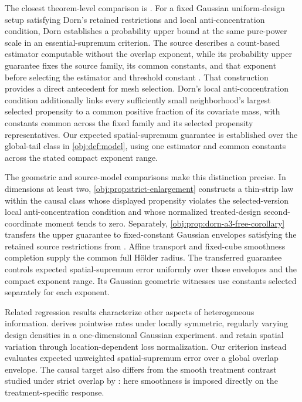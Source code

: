 The closest theorem-level comparison is \citet[Assumptions 1--3 and Theorem 1(ii), p.~12]{Dorn2026GlobalOverlap}. For a fixed Gaussian uniform-design setup satisfying Dorn's retained restrictions and local anti-concentration condition, Dorn establishes a probability upper bound at the same pure-power scale in an essential-supremum criterion. The source describes a count-based estimator computable without the overlap exponent, while its probability upper guarantee fixes the source family, its common constants, and that exponent before selecting the estimator and threshold constant \citep[Lemmas 11 and 13, pp.~23--24; proof, pp.~27--28]{Dorn2026GlobalOverlap}. That construction provides a direct antecedent for mesh selection. Dorn's local anti-concentration condition additionally links every sufficiently small neighborhood's largest selected propensity to a common positive fraction of its covariate mass, with constants common across the fixed family and its selected propensity representatives. Our expected spatial-supremum guarantee is established over the global-tail class in \cref{obj:def:model}, using one estimator and common constants across the stated compact exponent range.

The geometric and source-model comparisons make this distinction precise. In dimensions at least two, \cref{obj:prop:strict-enlargement} constructs a thin-strip law within the causal class whose displayed propensity violates the selected-version local anti-concentration condition and whose normalized treated-design second-coordinate moment tends to zero. Separately, \cref{obj:prop:dorn-a3-free-corollary} transfers the upper guarantee to fixed-constant Gaussian envelopes satisfying the retained source restrictions from \citet[Section 2, Assumptions 1--2, pp.~3--7]{Dorn2026GlobalOverlap}. Affine transport and fixed-cube smoothness completion supply the common full Hölder radius. The transferred guarantee controls expected spatial-supremum error uniformly over those envelopes and the compact exponent range. Its Gaussian geometric witnesses use constants selected separately for each exponent.

Related regression results characterize other aspects of heterogeneous information. \citet[Assumption M and Theorem 1, pp.~3--4]{Gaiffas2005DegenerateRates} derives pointwise rates under locally symmetric, regularly varying design densities in a one-dimensional Gaussian experiment. \citet[Assumption D, equation (2.1), and Theorems 1--2]{gaiffas2009} and \citet[Sections 1 and 3]{schmidthieber2024} retain spatial variation through location-dependent loss normalization. Our criterion instead evaluates expected unweighted spatial-supremum error over a global overlap envelope. The causal target also differs from the smooth treatment contrast studied under strict overlap by \citet[Theorems 1--2 and Remark 11]{KennedyBalakrishnanRobinsWasserman2024}: here smoothness is imposed directly on the treatment-specific response.

